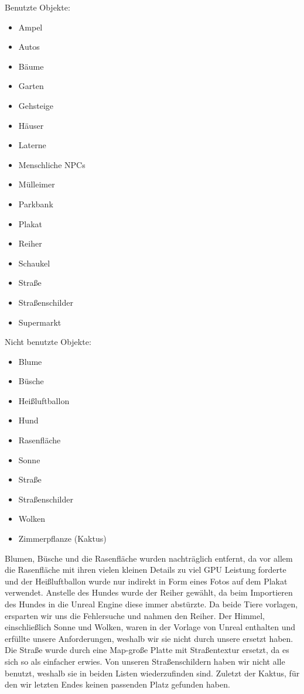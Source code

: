 \documentclass{Bericht}
\begin{document}
	\begin{minipage}[t]{0.5\textwidth}
	\vspace{1mm}
		Benutzte Objekte:
		\begin{itemize}
			\setlength{\itemsep}{0em}
			\item Ampel
			\item Autos
			\item Bäume
			\item Garten
			\item Gehsteige
			\item Häuser
			\item Laterne
			\item Menschliche NPCs
			\item Mülleimer
			\item Parkbank
			\item Plakat
			\item Reiher
			\item Schaukel
			\item Straße
			\item Straßenschilder
			\item Supermarkt
		\end{itemize}
	\vspace{1mm}
	\end{minipage}
	\begin{minipage}[t]{0.5\textwidth}
	\vspace{1mm}
		Nicht benutzte Objekte:
		\begin{itemize}
			\setlength{\itemsep}{0em}
			\item Blume
			\item Büsche
			\item Heißluftballon
			\item Hund
			\item Rasenfläche
			\item Sonne
			\item Straße
			\item Straßenschilder
			\item Wolken
			\item Zimmerpflanze (Kaktus)
		\end{itemize}
	\vspace{1mm}
	\end{minipage}
	
		Blumen, Büsche und die Rasenfläche wurden nachträglich entfernt, da vor allem die Rasenfläche mit ihren vielen kleinen Details zu viel GPU Leistung forderte und der Heißluftballon wurde nur indirekt in Form eines Fotos auf dem Plakat verwendet. 
 		Anstelle des Hundes wurde der Reiher gewählt, da beim Importieren des Hundes in die Unreal Engine diese immer abstürzte. Da beide Tiere vorlagen, ersparten wir uns die Fehlersuche und nahmen den Reiher. 
		Der Himmel, einschließlich Sonne und Wolken, waren in der Vorlage von Unreal enthalten und erfüllte unsere Anforderungen, weshalb wir sie nicht durch unsere ersetzt haben. 
		Die Straße wurde durch eine Map-große Platte mit Straßentextur ersetzt, da es sich so als einfacher erwies. 
		Von unseren Straßenschildern haben wir nicht alle benutzt, weshalb sie in beiden Listen wiederzufinden sind. 
		Zuletzt der Kaktus, für den wir letzten Endes keinen passenden Platz gefunden haben. \\
\end{document}
